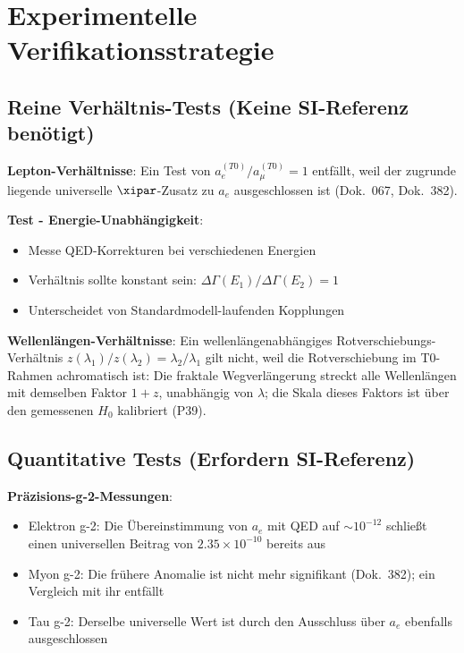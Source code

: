 	\section{Experimentelle Verifikationsstrategie}
	
	\subsection{Reine Verhältnis-Tests (Keine SI-Referenz benötigt)}
	
	\textbf{Lepton-Verhältnisse}: Ein Test von $a_e^{(T0)}/a_{\mu}^{(T0)} = 1$ entfällt, weil der zugrunde liegende universelle $\xipar$-Zusatz zu $a_e$ ausgeschlossen ist (Dok.~067, Dok.~382).
	
	\textbf{Test - Energie-Unabhängigkeit}:
	\begin{itemize}
		\item Messe QED-Korrekturen bei verschiedenen Energien
		\item Verhältnis sollte konstant sein: $\Delta\Gamma(E_1)/\Delta\Gamma(E_2) = 1$
		\item Unterscheidet von Standardmodell-laufenden Kopplungen
	\end{itemize}
	
	\textbf{Wellenlängen-Verhältnisse}: Ein wellenlängenabhängiges Rotverschiebungs-Verhältnis $z(\lambda_1)/z(\lambda_2) = \lambda_2/\lambda_1$ gilt nicht, weil die Rotverschiebung im T0-Rahmen achromatisch ist: Die fraktale Wegverlängerung streckt alle Wellenlängen mit demselben Faktor $1+z$, unabhängig von $\lambda$; die Skala dieses Faktors ist über den gemessenen $H_0$ kalibriert (P39).
	
	\subsection{Quantitative Tests (Erfordern SI-Referenz)}
	
	\textbf{Präzisions-g-2-Messungen}:
	\begin{itemize}
		\item Elektron g-2: Die Übereinstimmung von $a_e$ mit QED auf $\sim10^{-12}$ schließt einen universellen Beitrag von $2.35 \times 10^{-10}$ bereits aus
		\item Myon g-2: Die frühere Anomalie ist nicht mehr signifikant (Dok.~382); ein Vergleich mit ihr entfällt
		\item Tau g-2: Derselbe universelle Wert ist durch den Ausschluss über $a_e$ ebenfalls ausgeschlossen
	\end{itemize}
	
